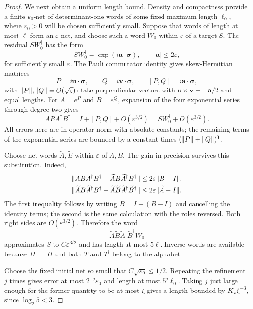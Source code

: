 \begin{proof}
We next obtain a uniform length bound. Density and compactness provide a
finite $\varepsilon_0$-net of determinant-one words of some fixed maximum
length $\ell_0$, where $\varepsilon_0>0$ will be chosen sufficiently small.
Suppose that words of length at most $\ell$ form an $\varepsilon$-net, and
choose such a word $W_0$ within $\varepsilon$ of a target $S$. The residual
$S W_0^\dagger$ has the form
\[
 S W_0^\dagger=\exp(i\mathbf a\cdot\boldsymbol\sigma),
 \qquad |\mathbf a|\le 2\varepsilon,
\]
for sufficiently small $\varepsilon$. The Pauli commutator identity gives
skew-Hermitian matrices
\[
 P=i\mathbf u\cdot\boldsymbol\sigma,\qquad
 Q=i\mathbf v\cdot\boldsymbol\sigma,
 \qquad [P,Q]=i\mathbf a\cdot\boldsymbol\sigma,
\]
with $\lVert P\rVert,\lVert Q\rVert=O(\sqrt\varepsilon)$: take perpendicular vectors
with $\mathbf u\times\mathbf v=-\mathbf a/2$ and equal lengths.
For $A=e^P$ and $B=e^Q$, expansion of the four exponential series through
degree two gives
\[
 ABA^\dagger B^\dagger=I+[P,Q]+O(\varepsilon^{3/2})
                    =S W_0^\dagger+O(\varepsilon^{3/2}).
\]
All errors here are in operator norm with absolute constants; the remaining
terms of the exponential series are bounded by a constant times
$(\lVert P\rVert+\lVert Q\rVert)^3$.

Choose net words $\widetilde A,\widetilde B$ within $\varepsilon$ of
$A,B$. The gain in precision survives this substitution. Indeed,
\begin{align*}
 \lVert ABA^\dagger B^\dagger-
        \widetilde A B\widetilde A^\dagger B^\dagger\rVert
 &\le 2\varepsilon\lVert B-I\rVert,\\
 \lVert \widetilde A B\widetilde A^\dagger B^\dagger-
        \widetilde A\widetilde B\widetilde A^\dagger\widetilde B^\dagger\rVert
 &\le 2\varepsilon\lVert \widetilde A-I\rVert.
\end{align*}
The first inequality follows by writing $B=I+(B-I)$ and cancelling the
identity terms; the second is the same calculation with the roles reversed.
Both right sides are $O(\varepsilon^{3/2})$. Therefore the word
\[
 \widetilde A\widetilde B\widetilde A^\dagger
 \widetilde B^\dagger W_0
\]
approximates $S$ to $C\varepsilon^{3/2}$ and has length at most $5\ell$.
Inverse words are available because $H^\dagger=H$ and both $T$ and
$T^\dagger$ belong to the alphabet.

Choose the fixed initial net so small that
$C\sqrt{\varepsilon_0}\le1/2$. Repeating the refinement $j$ times gives
error at most $2^{-j}\varepsilon_0$ and length at most $5^j\ell_0$.
Taking $j$ just large enough for the former quantity to be at most $\xi$
gives a length bounded by $K_{\mathrm w}\xi^{-3}$, since $\log_2 5<3$.
\end{proof}

